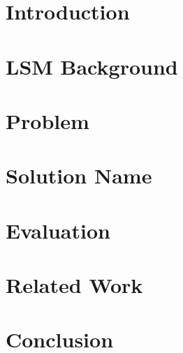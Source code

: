 \documentclass[sigconf]{acmart}
\begin{document}
\begin{abstract}
    
\end{abstract}




\maketitle

\section{Introduction}
\label{sec:intro}


\section{LSM Background}
\label{sec:background}



\section{Problem}
\label{sec:design_space}

 
\section{Solution Name}
\label{sec:solution}


% 

\section{Evaluation}
\label{sec:experimental_results}


\section{Related Work}
\label{sec:related_work}

 
\section{Conclusion}
\label{sec:conclusion}



\balance 
{
 
} 
\end{document}
